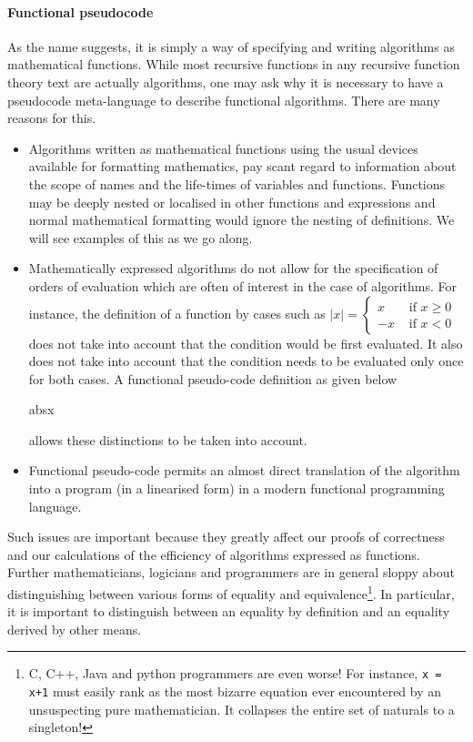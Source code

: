 \documentclass[a4]{article}
\begin{document}
\paragraph{Functional pseudocode} As the name suggests, it is simply a
way of specifying and writing algorithms as mathematical
functions. While most recursive functions in any recursive function
theory text are actually algorithms, one may ask why it is necessary to have a
pseudocode meta-language to describe functional algorithms. There are many
reasons for this.
\begin{itemize}
\item Algorithms written as mathematical functions using the usual devices
  available for formatting mathematics, pay scant regard to information about
  the scope of names and the life-times of variables and functions. Functions
  may be deeply nested or localised in other functions and expressions and
  normal mathematical formatting would ignore the nesting of definitions. We
  will see examples of this as we go along.
\item Mathematically expressed algorithms do not allow for the specification of
  orders of evaluation which are often of interest in the case of
  algorithms. For instance, the definition of a function by cases such as
  $|x| = \left\{ 
    \begin{array}{ll} 
      x & \mbox{~if~} x \geq 0\\
      -x & \mbox{~if~} x < 0
    \end{array}
    \right.$
  does not take into account that the condition would be first evaluated. It
  also does not take into account that the condition needs to be  evaluated only
  once for both cases. A functional pseudo-code definition as given below
 
  \begin{pseudocode}{abs}{x}
  \BEGIN
    \CASES
    \ENDCASES
  \END
\end{pseudocode}

allows these distinctions to be taken into account.
\item Functional pseudo-code permits an almost direct translation of the
  algorithm into a program (in a linearised form) in a modern functional
  programming language.
\end{itemize}

Such issues are important because they greatly affect our proofs of correctness
and our calculations of the efficiency of algorithms expressed as
functions. Further mathematicians, logicians and programmers are in general
sloppy about distinguishing between various forms of equality and
equivalence\footnote{C, C++, Java and python programmers are even worse! For
  instance, {\tt x = x+1} must easily rank as the most bizarre equation ever
  encountered by an unsuspecting pure mathematician. It collapses the entire set
  of naturals to a singleton!}.  In particular, it is important to distinguish
between an equality by definition and an equality derived by other means.
\end{document}

